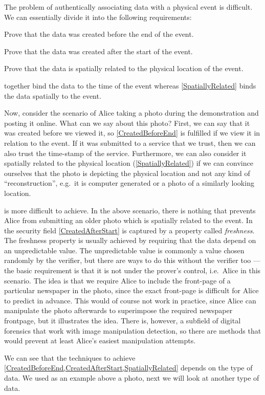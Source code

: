 The problem of authentically associating data with a physical event is 
difficult.
We can essentially divide it into the following requirements:
\begin{requirements}[A]
  \item\label{CreatedBeforeEnd} Prove that the data was created before the end 
    of the event.
  \item\label{CreatedAfterStart} Prove that the data was created after the 
    start of the event.
  \item\label{SpatiallyRelated} Prove that the data is spatially related to 
    the physical location of the event.
\end{requirements}
 together bind the data to the time of 
the event whereas \cref{SpatiallyRelated} binds the data spatially to the 
event.

Now, consider the scenario of Alice taking a photo during the demonstration and 
posting it online.
What can we say about this photo?
First, we can say that it was created before we viewed it, so 
\cref{CreatedBeforeEnd} is fulfilled if we view it in relation to the event.
If it was submitted to a service that we trust, then we can also trust the 
time-stamp of the service.
Furthermore, we can also consider it spatially related to the physical location
(\cref{SpatiallyRelated}) if we can convince ourselves that the photo is 
depicting the physical location and not any kind of \enquote{reconstruction}, 
e.g.\ it is computer generated or a photo of a similarly looking location.

 is more difficult to achieve.
In the above scenario, there is nothing that prevents Alice from submitting an 
older photo which is spatially related to the event.
In the security field \cref{CreatedAfterStart} is captured by a property called 
\emph{freshness}.
The freshness property is usually achieved by requiring that the data depend on
an unpredictable value.
The unpredictable value is commonly a value chosen randomly by the verifier, 
but there are ways to do this without the verifier too --- the basic 
requirement is that it is not under the prover's control, i.e.\ Alice in this 
scenario.
The idea is that we require Alice to include the front-page of a particular 
newspaper in the photo, since the exact front-page is difficult for Alice to 
predict in advance.
This would of course not work in practice, since Alice can manipulate the photo 
afterwards to superimpose the required newspaper frontpage, but it illustrates 
the idea.
There is, however, a subfield of digital forensics that work with image 
manipulation detection, so there are methods that would prevent at least 
Alice's easiest manipulation attempts.

We can see that the techniques to achieve 
\cref{CreatedBeforeEnd,CreatedAfterStart,SpatiallyRelated} depends on the type 
of data.
We used as an example above a photo, next we will look at another type of data.
